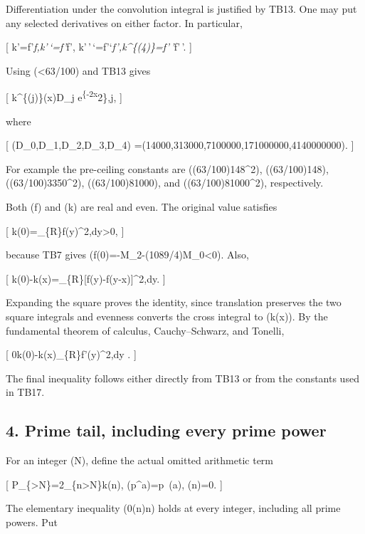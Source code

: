 \documentclass[
]{article}
\begin{document}
Differentiation under the convolution integral is justified by TB13. One
may put any selected derivatives on either factor. In particular,

{[} k'=f'\emph{f,\quad k'\,`=f'}f',\quad
k'\,'\,`=f'`\emph{f',\quad k\^{}\{(4)\}=f'\,'}f'\,'. {]}

Using (\textless63/100) and TB13 gives

{[} \textbar k\^{}\{(j)\}(x)\textbar{}\le D\_j
e\textsuperscript{\{-2x}2\},\le j,  {]}

where

{[} (D\_0,D\_1,D\_2,D\_3,D\_4)
=(14000,313000,7100000,171000000,4140000000). {]}

For example the pre-ceiling constants are ((63/100)148\^{}2),
((63/100)148), ((63/100)3350\^{}2), ((63/100)81000),
and ((63/100)81000\^{}2), respectively.

Both (f) and (k) are real and even. The original value satisfies

{[} k(0)=\int\_\{\mathbb R\}f(y)\^{}2,dy\textgreater0, {]}

because TB7 gives (f(0)=-M\_2-(1089/4)M\_0\textless0). Also,

{[} k(0)-k(x)=\int\_\{\mathbb R\}{[}f(y)-f(y-x){]}\^{}2,dy.
 {]}

Expanding the square proves the identity, since translation preserves
the two square integrals and evenness converts the cross integral to
(k(x)). By the fundamental theorem of calculus, Cauchy--Schwarz, and
Tonelli,

{[}
0\le k(0)-k(x)\le{}\int\_\{\mathbb R\}\textbar f'(y)\textbar\^{}2,dy
\le{}.  {]}

The final inequality follows either directly from TB13 or from the
constants used in TB17.

\subsection{4. Prime tail, including every prime
power}\label{prime-tail-including-every-prime-power}

For an integer (N), define the actual omitted arithmetic term

{[}
P\_\{\textgreater N\}=2\sum\_\{n\textgreater N\}k(\log n),
\quad \Lambda(p\^{}a)=\log p~(a),
\quad \Lambda(n)=0.  {]}

The elementary inequality (0\le\Lambda(n)\le\log n) holds at every
integer, including all prime powers. Put
\end{document}
